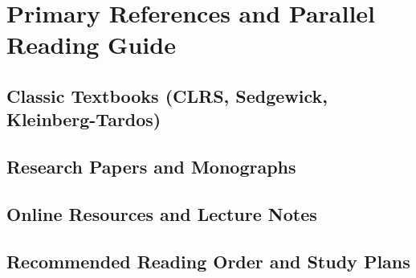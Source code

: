 \chapter{Primary References and Parallel Reading Guide}
\section{Classic Textbooks (CLRS, Sedgewick, Kleinberg-Tardos)}
\section{Research Papers and Monographs}
\section{Online Resources and Lecture Notes}
\section{Recommended Reading Order and Study Plans}